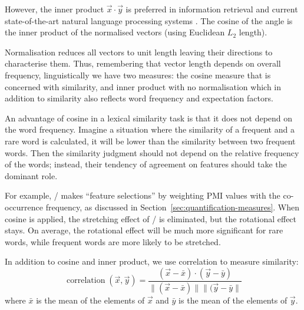 However, the inner product $\vec{x} \cdot \vec{y}$ is preferred in information retrieval and current state-of-the-art natural language processing systems \cite{mikolov2013distributed,mikolov2013linguistic,TACL570}. The cosine of the angle is the inner product of the normalised vectors (using Euclidean $L_2$ length).
%
%

Normalisation reduces all vectors to unit length leaving their directions to characterise them. Thus, remembering that vector length depends on overall frequency, linguistically we have two measures: the cosine measure that is concerned with similarity, and inner product with no normalisation which in addition to similarity also reflects word frequency and expectation factors.
%
%

An advantage of cosine in a lexical similarity task is that it does not depend on the word frequency. Imagine a situation where the similarity of a frequent and a rare word is calculated, it will be lower than the similarity between two frequent words. Then the similarity judgment should not depend on the relative frequency of the words; instead, their tendency of agreement on features should take the dominant role.

For example, \NPMI/ makes ``feature selections'' by weighting PMI values with the co-occurrence frequency, as discussed in Section~\ref{sec:quantification-measures}. When cosine is applied, the stretching effect of \NPMI/ is eliminated, but the rotational effect stays. On average, the rotational effect will be much more significant for rare words, while frequent words are more likely to be stretched.

In addition to cosine and inner product, we use correlation \cite{kiela-clark:2014:CVSC} to measure similarity:
\begin{equation}
  \label{eq:correlation}
  \operatorname{correlation}(\vec{x}, \vec{y}) = \frac{(\vec{x} - \bar{x}) \cdot (\vec{y} - \bar{y})}
                                {\|(\vec{x} - \bar{x})\| \|(\vec{y}-\bar{y}\|}
\end{equation}
where $\bar{x}$ is the mean of the elements of $\vec{x}$ and $\bar{y}$ is the mean of the elements of $\vec{y}$.

